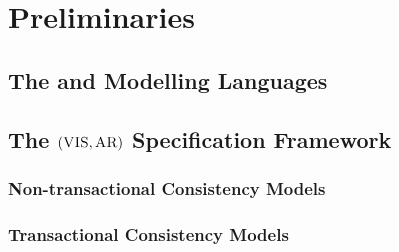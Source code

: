 
\section{Preliminaries}  \label{section:preliminaries}

\subsection{The \alloy{} and \alloystar{} Modelling Languages} \label{ss:alloy}

\subsection{The $(\textsc{VIS}, \textsc{AR})$ Specification Framework} \label{ss:vis-ar}

\subsubsection{Non-transactional Consistency Models} \label{sss:non-tcm}

\subsubsection{Transactional Consistency Models} \label{sss:tcm}

